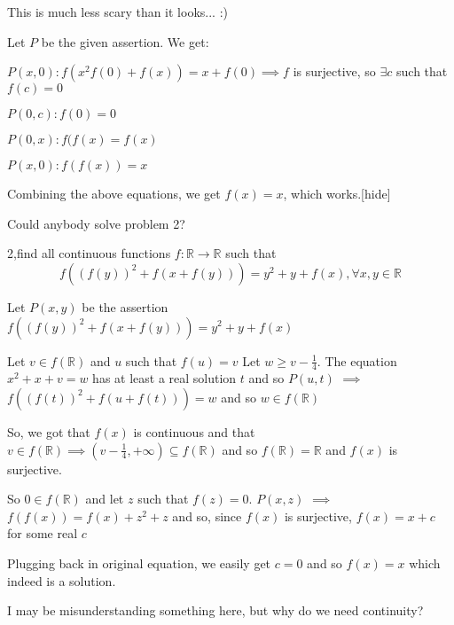 \begin{solution}This is much less scary than it looks... :)

Let $P$ be the given assertion. We get:

$P(x,0): f(x^2f(0)+f(x))=x+f(0) \implies f$ is surjective, so $\exists c$ such that $f(c)=0$

$P(0,c): f(0)=0$

$P(0,x): f(f(x)=f(x)$

$P(x,0): f(f(x))=x$

Combining the above equations, we get $f(x)=x$, which works.[\/hide]
\end{solution}



\begin{solution}
	Could anybody solve problem 2?
\end{solution}



\begin{solution}
	\begin{tcolorbox}2,find all continuous  functions $f:\mathbb{R}\to\mathbb{R}$ such that \[f(( f(y))^2+f(x+f(y)))=y^2+y+f(x),\forall x,y\in\mathbb{R}\]\end{tcolorbox}
Let $P(x,y)$ be the assertion $f((f(y))^2+f(x+f(y)))=y^2+y+f(x)$

Let $v\in f(\mathbb R)$ and $u$ such that $f(u)=v$
Let $w\ge v-\frac 14$. The equation $x^2+x+v=w$ has at least a real solution $t$ and so $P(u,t)$ $\implies$ $f((f(t))^2+f(u+f(t)))=w$ and so $w\in f(\mathbb R)$

So, we got that $f(x)$ is continuous and that $v\in f(\mathbb R)\implies \left(v-\frac 14,+\infty\right)\subseteq f(\mathbb R)$ and so $f(\mathbb R)=\mathbb R$ and $f(x)$ is surjective.

So $0\in f(\mathbb R)$ and let $z$ such that $f(z)=0$. $P(x,z)$ $\implies$ $f(f(x))=f(x)+z^2+z$ and so, since $f(x)$ is surjective, $f(x)=x+c$ for some real $c$

Plugging back in original equation, we easily get $c=0$ and so $\boxed{f(x)=x}$ which indeed is a solution.
\end{solution}



\begin{solution}
	I may be misunderstanding something here, but why do we need continuity?
\end{solution}



